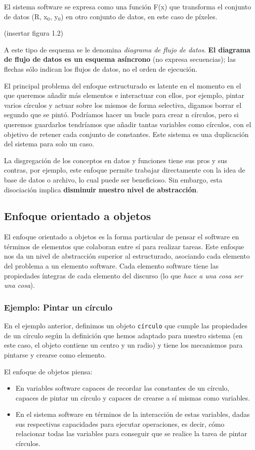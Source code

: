El sistema software se expresa como una función F(x) que transforma el
conjunto de datos (R, x\(_{\text{0}}\), y\(_{\text{0}}\)) en otro
conjunto de datos, en este caso de píxeles.

(insertar figura 1.2)

A este tipo de esquema se le denomina \emph{diagrama de flujo de
  datos}. \textbf{El diagrama de flujo de datos es un esquema
  asíncrono} (no expresa secuencias); las flechas sólo indican los
flujos de datos, no el orden de ejecución.


El principal problema del enfoque estructurado es latente en el
momento en el que queremos añadir más elementos e interactuar con
ellos, por ejemplo, pintar varios círculos y actuar sobre los mismos
de forma selectiva, digamos borrar el segundo que se pintó.  Podríamos
hacer un bucle para crear n círculos, pero si queremos guardarlos
tendríamos que añadir tantas variables como círculos, con el objetivo
de retener cada conjunto de constantes. Este sistema es una
duplicación del sistema para solo un caso.


La disgregación de los conceptos en datos y funciones tiene sus pros y
sus contras, por ejemplo, este enfoque permite trabajar directamente
con la idea de base de datos o archivo, lo cual puede ser
beneficioso. Sin embargo, esta disociación implica \textbf{disminuir
  nuestro nivel de abstracción}.
\subsection{Enfoque orientado a objetos}
\label{sec:orgab1dc13}
El enfoque orientado a objetos es la forma particular de pensar el
software en términos de elementos que colaboran entre sí para realizar
tareas.  Este enfoque nos da un nivel de abstracción superior al
estructurado, asociando cada elemento del problema a un elemento
software.  Cada elemento software tiene las propiedades íntegras de
cada elemento del discurso (lo que \emph{hace a una cosa ser una
  cosa}).
\subsubsection{Ejemplo: Pintar un círculo}
\label{sec:orge1a8962}
En el ejemplo anterior, definimos un objeto \texttt{círculo} que
cumple las propiedades de un círculo según la definición que hemos
adaptado para nuestro sistema (en este caso, el objeto contiene un
centro y un radio) y tiene los mecanismos para pintarse y crearse como
elemento.

El enfoque de objetos piensa:
\begin{itemize}
\item En variables software capaces de recordar las constantes de un
  círculo, capaces de pintar un círculo y capaces de crearse a sí
  mismas como variables.
\item En el sistema software en términos de la interacción de estas variables, dadas sus respectivas capacidades para ejecutar operaciones, es decir, cómo
relacionar todas las variables para conseguir que se realice la tarea de pintar círculos.
\end{itemize}

